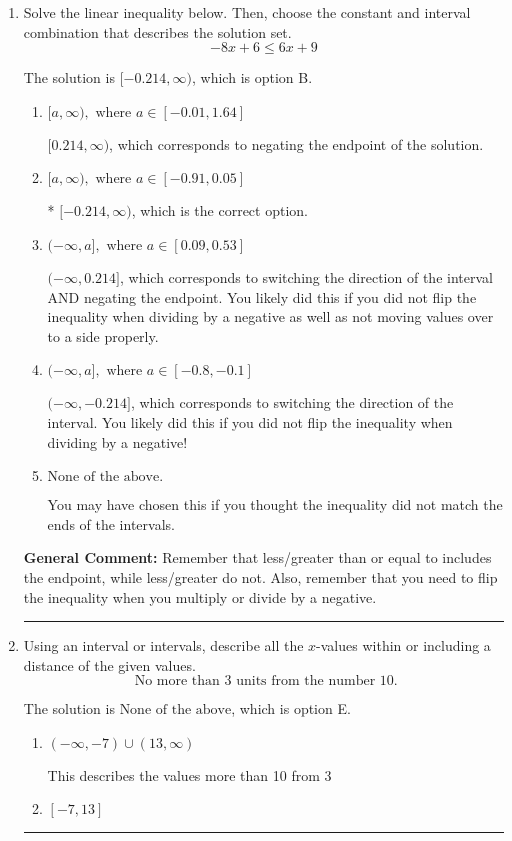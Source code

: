 \documentclass{extbook}[14pt]
\newcommand{\litem}[1]{\item #1

\rule{\textwidth}{0.4pt}}
\begin{document}
\begin{enumerate}\litem{
Solve the linear inequality below. Then, choose the constant and interval combination that describes the solution set.
\[ -8x + 6 \leq 6x + 9 \]

The solution is \( [-0.214, \infty) \), which is option B.\begin{enumerate}[label=\Alph*.]
\item \( [a, \infty), \text{ where } a \in [-0.01, 1.64] \)

 $[0.214, \infty)$, which corresponds to negating the endpoint of the solution.
\item \( [a, \infty), \text{ where } a \in [-0.91, 0.05] \)

* $[-0.214, \infty)$, which is the correct option.
\item \( (-\infty, a], \text{ where } a \in [0.09, 0.53] \)

 $(-\infty, 0.214]$, which corresponds to switching the direction of the interval AND negating the endpoint. You likely did this if you did not flip the inequality when dividing by a negative as well as not moving values over to a side properly.
\item \( (-\infty, a], \text{ where } a \in [-0.8, -0.1] \)

 $(-\infty, -0.214]$, which corresponds to switching the direction of the interval. You likely did this if you did not flip the inequality when dividing by a negative!
\item \( \text{None of the above}. \)

You may have chosen this if you thought the inequality did not match the ends of the intervals.
\end{enumerate}

\textbf{General Comment:} Remember that less/greater than or equal to includes the endpoint, while less/greater do not. Also, remember that you need to flip the inequality when you multiply or divide by a negative.
}
\litem{
Using an interval or intervals, describe all the $x$-values within or including a distance of the given values.
\[ \text{ No more than } 3 \text{ units from the number } 10. \]

The solution is \( \text{None of the above} \), which is option E.\begin{enumerate}[label=\Alph*.]
\item \( (-\infty, -7) \cup (13, \infty) \)

This describes the values more than 10 from 3
\item \( [-7, 13] \)


\end{enumerate}}
\end{enumerate}
\end{document}
